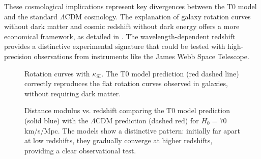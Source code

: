 \documentclass[12pt,a4paper]{article}
\begin{document}
	These cosmological implications represent key divergences between the T0 model and the standard \(\Lambda\)CDM cosmology. The explanation of galaxy rotation curves without dark matter and cosmic redshift without dark energy offers a more economical framework, as detailed in \cite{pascher_messdifferenzen_2025}. The wavelength-dependent redshift provides a distinctive experimental signature that could be tested with high-precision observations from instruments like the James Webb Space Telescope.
	
	\begin{figure}[h]
		\centering
		\caption{Rotation curves with \(\kappa_{\text{SI}}\). The T0 model prediction (red dashed line) correctly reproduces the flat rotation curves observed in galaxies, without requiring dark matter.}
		\label{fig:rotation_curves}
	\end{figure}
	
	\begin{figure}[ht]
		\centering
		\caption{Distance modulus vs. redshift
			comparing the T0 model prediction (solid blue)
			with the $\Lambda$CDM prediction (dashed red)
			for $H_0 = 70$ km/s/Mpc.
			The models show a distinctive pattern: initially far apart at low redshifts,
			they gradually converge at higher redshifts,
			providing a clear observational test.}
		\label{fig:distance_modulus}
	\end{figure}
	
\end{document}
